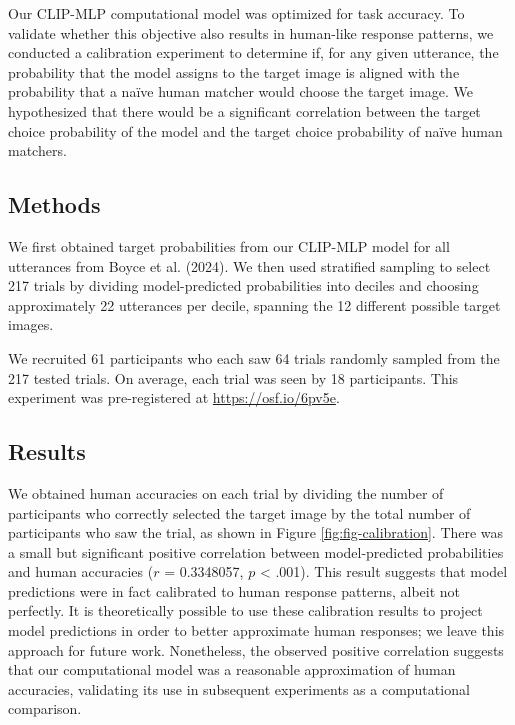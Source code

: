 \documentclass[10pt, letterpaper]{article}
\begin{document}
Our CLIP-MLP computational model was optimized for task accuracy. To
validate whether this objective also results in human-like response
patterns, we conducted a calibration experiment to determine if, for any
given utterance, the probability that the model assigns to the target
image is aligned with the probability that a naïve human matcher would
choose the target image. We hypothesized that there would be a
significant correlation between the target choice probability of the
model and the target choice probability of naïve human matchers.

\subsection{Methods}\label{methods}

We first obtained target probabilities from our CLIP-MLP model for all
utterances from Boyce et al. (2024). We then used stratified sampling to
select 217 trials by dividing model-predicted probabilities into deciles
and choosing approximately 22 utterances per decile, spanning the 12
different possible target images.

We recruited 61 participants who each saw 64 trials randomly sampled
from the 217 tested trials. On average, each trial was seen by 18
participants. This experiment was pre-registered at
\url{https://osf.io/6pv5e}.

\subsection{Results}\label{results}

We obtained human accuracies on each trial by dividing the number of
participants who correctly selected the target image by the total number
of participants who saw the trial, as shown in Figure
\ref{fig:fig-calibration}. There was a small but significant positive
correlation between model-predicted probabilities and human accuracies
(\(r\) = 0.3348057, \(p\) \textless{} .001). This result suggests that
model predictions were in fact calibrated to human response patterns,
albeit not perfectly. It is theoretically possible to use these
calibration results to project model predictions in order to better
approximate human responses; we leave this approach for future work.
Nonetheless, the observed positive correlation suggests that our
computational model was a reasonable approximation of human accuracies,
validating its use in subsequent experiments as a computational
comparison.
\end{document}
